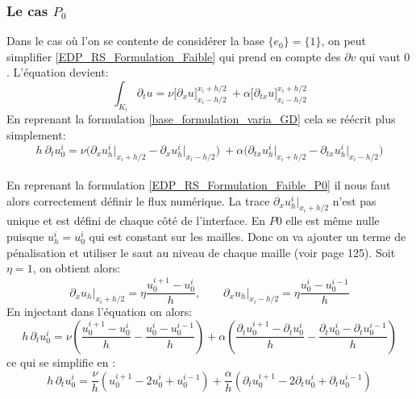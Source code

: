 \subsubsection{Le cas \texorpdfstring{$P_0$}{P0}}
Dans le cas où l'on se contente de considérer la base  $\{e_0\} = \{ 1 \}$, on peut simplifier \eqref{EDP_RS_Formulation_Faible} qui prend en compte des $\partial v$ qui vaut $0$.
L'équation devient:
\begin{equation*}
    \int_{K_i} \partial_t u =  \nu \Big[\partial_{x}u \Big]^{x_i +h/2}_{x_i - h/2} \ + \alpha \Big[\partial_{tx}u \Big]^{x_i +h/2}_{x_i - h/2} 
\end{equation*}
En reprenant la formulation \eqref{base_formulation_varia_GD} cela se réécrit plus simplement:
\begin{equation}\label{EDP_RS_Formulation_Faible_P0}
    h\ \partial_t u_0^i = \nu \Big(\partial_{x}u_h^i\big|_{x_i + h/2} - \partial_{x}u_h^i\big|_{x_i - h/2} \Big) \ + \alpha \Big(\partial_{tx}u_h^i\big|_{x_i + h/2}- \partial_{tx}u_h^i\big|_{x_i - h/2}\Big) 
\end{equation}
\\
En reprenant la formulation \eqref{EDP_RS_Formulation_Faible_P0} il nous faut alors correctement définir le flux numérique. La trace $\partial_{x}u_h^i\big|_{x_i + h/2}$ n'est pas unique et est défini de chaque côté de l'interface. En $P0$ elle est même nulle puisque $u_h^i = u_0^i$ qui est constant sur les mailles. Donc on va ajouter un terme de pénalisation et utiliser le saut au niveau de chaque maille (voir \cite{DiPietro2012} page 125). Soit $\eta = 1$, on obtient alors:
\begin{equation*}
    \partial_x u_h\big|_{x_i + h/2} = \eta \frac{u_0^{i+1} - u_0^i}{h}, \qquad
    \partial_x u_h\big|_{x_i - h/2} = \eta \frac{u_0^i - u_0^{i-1}}{h}
\end{equation*}
En injectant dans l'équation on alors:
\begin{equation*}
    h\,\partial_t u_0^i = \nu\left(\frac{u_0^{i+1} - u_0^i}{h} - \frac{u_0^i - u_0^{i-1}}{h}\right)
    + \alpha\left(\frac{\partial_t u_0^{i+1} - \partial_t u_0^i}{h} - \frac{\partial_t u_0^i - \partial_t u_0^{i-1}}{h}\right)
\end{equation*}
ce qui se simplifie en :
\begin{equation*}
    h\,\partial_t u_0^i = \frac{\nu}{h}\left(u_0^{i+1} - 2u_0^i + u_0^{i-1}\right)
    + \frac{\alpha}{h}\left(\partial_t u_0^{i+1} - 2\partial_t u_0^i + \partial_t u_0^{i-1}\right)
\end{equation*}

